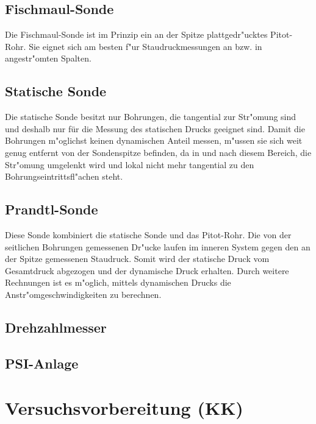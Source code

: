 \subsection{Fischmaul-Sonde}
Die Fischmaul-Sonde ist im Prinzip ein an der Spitze plattgedr"ucktes Pitot-Rohr. Sie eignet sich am besten f"ur Staudruckmessungen an bzw. in angestr"omten Spalten.

\subsection{Statische Sonde}
Die statische Sonde besitzt nur Bohrungen, die tangential zur Str"omung sind und deshalb nur für die Messung des statischen Drucks geeignet sind.
Damit die Bohrungen m"oglichst keinen dynamischen Anteil messen, m"ussen sie sich weit genug entfernt von der Sondenspitze befinden, da in und nach diesem Bereich, die Str"omung umgelenkt wird und lokal nicht mehr tangential zu den Bohrungseintrittsfl"achen steht.

\subsection{Prandtl-Sonde}
Diese Sonde kombiniert die statische Sonde und das Pitot-Rohr.
Die von der seitlichen Bohrungen gemessenen Dr"ucke laufen im inneren System gegen den an der Spitze gemessenen Staudruck.
Somit wird der statische Druck vom Gesamtdruck abgezogen und der dynamische Druck erhalten. Durch weitere Rechnungen ist es m"oglich, mittels dynamischen Drucks die Anstr"omgeschwindigkeiten zu berechnen.

\subsection{Drehzahlmesser}

\subsection{PSI-Anlage}

\section{Versuchsvorbereitung (KK)}

